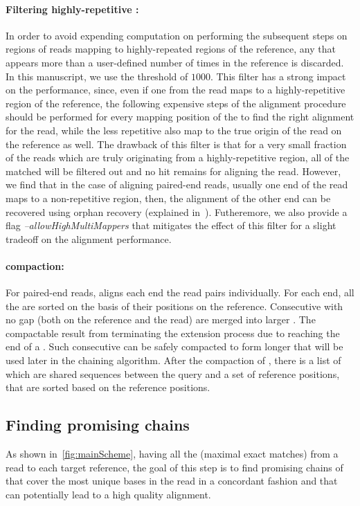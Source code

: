 \paragraph{Filtering highly-repetitive \unimems:}
\label{par:repetitivehits}
In order to avoid expending computation on performing the subsequent
steps on regions of reads mapping to highly-repeated regions of the
reference, any \unimem that appears more than a user-defined number
of times in the reference is discarded. In this manuscript, we use
the threshold of $1000$. This filter has a strong impact on the
performance, since, even if one \kmer from the read maps to a
highly-repetitive region of the reference, the following expensive
steps of the alignment procedure should be performed for every
mapping position of the \unimem to find the right alignment for the
read, while the less repetitive \unimems also map to the true origin
of the read on the reference as well. The drawback of this filter is that
for a very small fraction of the reads which are truly originating
from a highly-repetitive region, all of the matched \unimems will be
filtered out and no hit remains for aligning the read. However,
we find that in the case of aligning paired-end reads, usually one
end of the read maps to a non-repetitive region, then, the alignment
of the other end can be recovered using orphan recovery (explained
in~). Futheremore, we also provide 
a flag \textit{--allowHighMultiMappers} that mitigates the effect of this
filter for a slight tradeoff on the alignment performance.

\paragraph{\unimem compaction:}
For paired-end reads, \puffaligner aligns each end the read pairs
individually. For each end, all the \unimems are sorted on the basis
of their positions on the reference. Consecutive \unimems with no gap
(both on the reference and the read) are merged into larger \mems.
The compactable \unimems result from terminating the extension
process due to reaching the end of a \unitig. Such consecutive
\unimems can be safely compacted to form longer \mems that will be
used later in the \mem chaining algorithm. After the compaction of
\unimems, there is a list of \mems which are shared sequences between
the query and a set of reference positions, that are sorted based on
the reference positions.

\subsection{Finding promising \mem chains}
As shown in~\cref{fig:mainScheme}, having all the \mems
(maximal exact matches) from a read to each target reference, the
goal of this step is to find promising chains of \mems that cover the
most unique bases in the read in a concordant fashion and that can potentially lead to a high
quality alignment.

